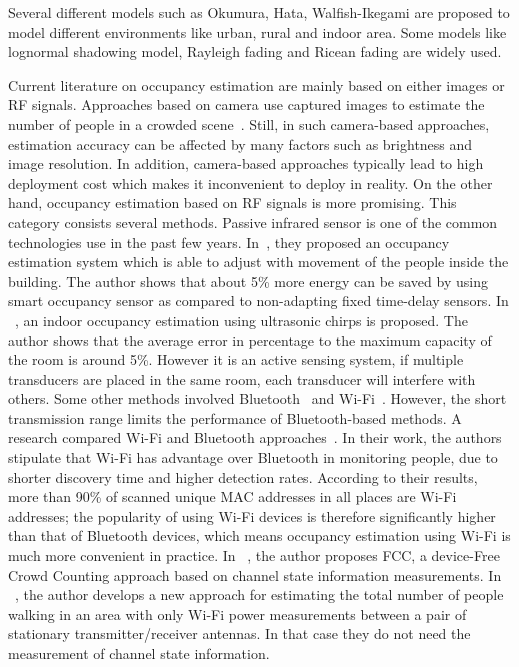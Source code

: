 Several different models such as Okumura, Hata, Walfish-Ikegami are proposed to model different environments like urban, rural and indoor area.
Some models like lognormal shadowing model, Rayleigh fading and Ricean fading are widely used.


Current literature on occupancy estimation are mainly based on either images or RF signals. Approaches based on camera use captured images to estimate the number of people in a crowded scene~\cite{Ma_2013_CVPR,Pe_count,li2008estimating}.
Still, in such camera-based approaches, estimation accuracy can be affected by many factors such as brightness and image resolution.
In addition, camera-based approaches typically lead to high deployment cost which makes it inconvenient to deploy in reality.
On the other hand, occupancy estimation based on RF signals is more promising. This category consists several methods. 
Passive infrared sensor is one of the common technologies use in the past few years. In~\cite{Garg200081}, they proposed an occupancy estimation system which is able to adjust with movement of the people inside the building. The author shows  that about 5\% more energy can be saved by using smart occupancy sensor as compared to non-adapting fixed time-delay sensors.
In ~\cite{Shih:2015:OEU:2735960.2735969}, an indoor occupancy estimation using ultrasonic chirps is proposed. The author shows that the average error in
percentage to the maximum capacity of the room is around 5\%. However it is an active sensing system, if multiple transducers are placed in the same room, each transducer will interfere with others.
Some other methods involved Bluetooth~\cite{B_ad_hoc} and Wi-Fi~\cite{W_power}. However, the short transmission range limits the performance of Bluetooth-based methods.
A research compared Wi-Fi and Bluetooth approaches~\cite{quteprints71808}.
In their work, the authors stipulate that Wi-Fi has advantage over Bluetooth in monitoring people, due to shorter discovery time and higher detection rates.
According to their results, more than 90\% of scanned unique MAC addresses in all places are Wi-Fi addresses; the popularity of using Wi-Fi devices is therefore significantly higher than that of Bluetooth devices, which means occupancy estimation using Wi-Fi is much more convenient in practice.
In ~\cite{6847958}, the author proposes FCC, a device-Free Crowd Counting approach based on channel state information measurements. In ~\cite{7102673},  the author develops a new approach for estimating the total number of people walking in an area with only Wi-Fi power measurements between a pair of stationary transmitter/receiver antennas. In that case they do not need the measurement of channel state information.

